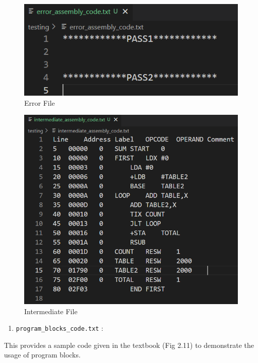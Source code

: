 \documentclass[
]{article}
\providecommand{\tightlist}{%
  \setlength{\itemsep}{0pt}\setlength{\parskip}{0pt}}
\begin{document}
\begin{figure}[H]
\centering
\includegraphics{img/image-1.png}
\caption{Error File}
\end{figure}

\begin{figure}[H]
\centering
\includegraphics{img/image-2.png}
\caption{Intermediate File}
\end{figure}

\begin{enumerate}
\def\labelenumi{\arabic{enumi})}
\tightlist
\item
  \texttt{program\_blocks\_code.txt} :
\end{enumerate}

This provides a sample code given in the textbook (Fig 2.11) to
demonstrate the usage of program blocks.
\end{document}
